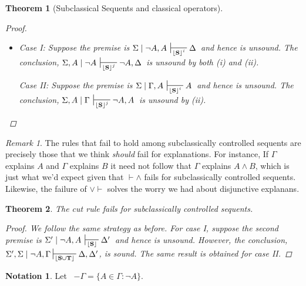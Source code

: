 \documentclass{article}                     %
\theoremstyle{theorem}
\newtheorem{theorem}{Theorem}
\theoremstyle{corollary}
\theoremstyle{lemma}
\theoremstyle{definition}
\theoremstyle{remark}
\newtheorem{remark}{Remark}
\theoremstyle{definition}
\theoremstyle{notation}
\newtheorem{notation}{Notation}
\theoremstyle{definition}
\theoremstyle{proposition}
\theoremstyle{definition}
\begin{document}
\begin{theorem}[Subclassical Sequents and classical operators]
\begin{proof}
\begin{itemize}[itemsep=3mm]
	\item[$\checkmark \vdash\neg $]
Case I: Suppose the premise is $\Sigma\mid\neg A ,A \,\sststile{\lfloor\mathbf{S}\rfloor^{i}}{} \Delta\,$ and hence is unsound. The conclusion, $\Sigma, A\mid\neg A \,\sststile{\lfloor\mathbf{S}\rfloor^{j}}{} \neg A, \Delta\,$ is unsound by both (i) and (ii).

Case II: Suppose the premise is $\Sigma\mid \Gamma, A \,\sststile{\lfloor\mathbf{S}\rfloor^{i}}{} A \,$ and hence is unsound. The conclusion, $\Sigma, A\mid\Gamma \,\sststile{\lfloor\mathbf{S}\rfloor^{j}}{} \neg A, A\,$ is unsound by (ii).

\end{itemize}
\end{proof}
\end{theorem}

\begin{remark}
The rules that fail to hold among subclassically controlled sequents are precisely those that we think \textit{should} fail for explanations. For instance, If $ \Gamma $ explains $ A $ and $ \Gamma $ explains $ B $ it need not follow that $ \Gamma $ explains $ A \wedge B$, which is just what we'd expect given that $ \vdash\wedge $ fails for subclassically controlled sequents. Likewise, the failure of $ \vee\vdash $ solves the worry we had about disjunctive explanans. 
\end{remark}

\begin{theorem}
The cut rule fails for subclassically controlled sequents.

\begin{proof}
We follow the same strategy as before. For case I, suppose the second premise is $\Sigma'\mid\neg A ,A \,\sststile{\lfloor\mathbf{S}\rfloor}{} \Delta'\,$ and hence is unsound. However, the conclusion, $ \Sigma',\Sigma\mid\neg A,\Gamma\sststile{\lfloor\mathbf{S\cup T}\rfloor}{}\Delta, \Delta'$, is sound. The same result is obtained for case II.
\end{proof}
\end{theorem}

\vspace{3mm}


\begin{notation}
Let \, $-\Gamma = \{A \in \Gamma : \neg A \}$.
\end{notation}
\end{document}
